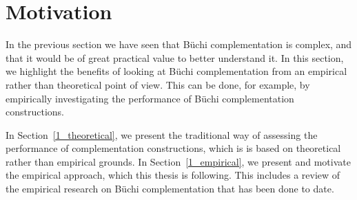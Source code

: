 


\section{Motivation}
\label{1_motivation}
In the previous section we have seen that Büchi complementation is complex, and that it would be of great practical value to better understand it. In this section, we highlight the benefits of looking at Büchi complementation from an empirical rather than theoretical point of view. This can be done, for example, by empirically investigating the performance of Büchi complementation constructions.

In Section~\ref{1_theoretical}, we present the traditional way of assessing the performance of complementation constructions, which is is based on theoretical rather than empirical grounds. In Section~\ref{1_empirical}, we present and motivate the empirical approach, which this thesis is following. This includes a review of the empirical research on Büchi complementation that has been done to date.

